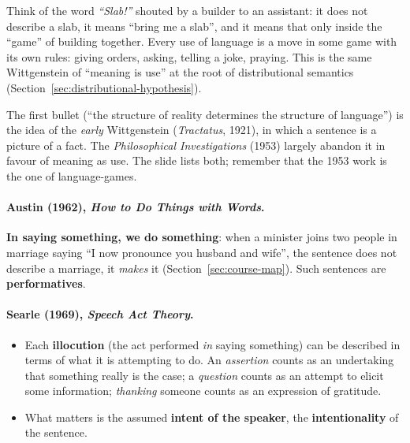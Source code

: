 \begin{nbintuition}
Think of the word \emph{``Slab!''} shouted by a builder to an assistant: it does not
describe a slab, it means ``bring me a slab'', and it means that only inside the
``game'' of building together. Every use of language is a move in some game with its own
rules: giving orders, asking, telling a joke, praying. This is the same Wittgenstein of
``meaning is use'' at the root of distributional semantics
(Section~\ref{sec:distributional-hypothesis}).
\end{nbintuition}

\begin{nbwarning}
The first bullet (``the structure of reality determines the structure of language'') is
the idea of the \emph{early} Wittgenstein (\emph{Tractatus}, 1921), in which a sentence is
a picture of a fact. The \emph{Philosophical Investigations} (1953) largely abandon it in
favour of meaning as use. The slide lists both; remember that the 1953 work is the one of
language-games.
\end{nbwarning}

\paragraph{Austin (1962), \emph{How to Do Things with Words}.}
\textbf{In saying something, we do something}: when a minister joins two people in
marriage saying ``I now pronounce you husband and wife'', the sentence does not describe
a marriage, it \emph{makes} it (Section~\ref{sec:course-map}). Such sentences are
\textbf{performatives}.

\paragraph{Searle (1969), \emph{Speech Act Theory}.}
\begin{itemize}[nosep]
  \item Each \textbf{illocution} (the act performed \emph{in} saying something) can be
        described in terms of what it is attempting to do. An \emph{assertion} counts as
        an undertaking that something really is the case; a \emph{question} counts as an
        attempt to elicit some information; \emph{thanking} someone counts as an
        expression of gratitude.
  \item What matters is the assumed \textbf{intent of the speaker}, the
        \textbf{intentionality} of the sentence.
\end{itemize}

